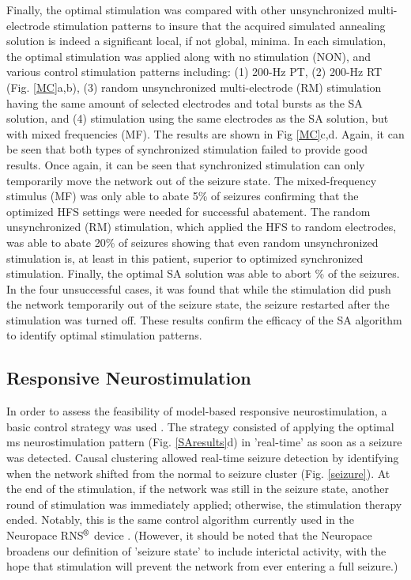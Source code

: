 \documentclass[11pt,a4paper,final]{article}
\begin{document}
Finally, the optimal stimulation was compared with other unsynchronized multi-electrode stimulation patterns to insure that the acquired simulated annealing solution is indeed a significant local, if not global, minima.
In each simulation, the optimal stimulation was applied along with no stimulation (NON), and various control stimulation patterns including:
(1) 200-Hz PT,
(2) 200-Hz RT (Fig. \ref{MC}a,b),
(3) random unsynchronized multi-electrode (RM) stimulation having the same amount of selected electrodes and total bursts as the SA solution, and
(4) stimulation using the same electrodes as the SA solution, but with mixed frequencies (MF).
The results are shown in Fig \ref{MC}c,d.
Again, it can be seen that both types of synchronized stimulation failed to provide good results.
Once again, it can be seen that synchronized stimulation can only  temporarily move the network out of the seizure state.
The mixed-frequency stimulus (MF) was only able to abate 5\% of seizures confirming that the optimized HFS settings were needed for successful abatement.
The random unsynchronized (RM) stimulation, which applied the HFS to random electrodes, was able to abate 20\% of seizures showing that even random unsynchronized stimulation is, at least in this patient, superior to optimized synchronized stimulation.
Finally, the optimal SA solution was able to abort \success{}\% of the seizures.
In the four unsuccessful cases, it was found that while the stimulation did push the network temporarily out of the seizure state, the seizure restarted after the stimulation was turned off.
These results confirm the efficacy of the SA algorithm to identify optimal stimulation patterns.

    \subsection{Responsive Neurostimulation}

In order to assess the feasibility of model-based responsive neurostimulation, a basic control strategy was used \citep{chakravarthy2007controlling, chakravarthy2009homeostasis, schiff2012neural}.
The strategy consisted of applying the optimal \len{} ms neurostimulation pattern (Fig. \ref{SAresults}d) in 'real-time' as soon as a seizure was detected.
Causal clustering allowed real-time seizure detection by identifying when the network shifted from the normal to seizure cluster (Fig. \ref{seizure}).
At the end of the stimulation, if the network was still in the seizure state, another round of stimulation was immediately applied; otherwise, the stimulation therapy ended.
Notably, this is the same control algorithm currently used in the Neuropace RNS$\textsuperscript{\textregistered}$ device \citep{NP}.
(However, it should be noted that the Neuropace broadens our definition of 'seizure state' to include interictal activity, with the hope that stimulation will prevent the network from ever entering a full seizure.)
\end{document}
